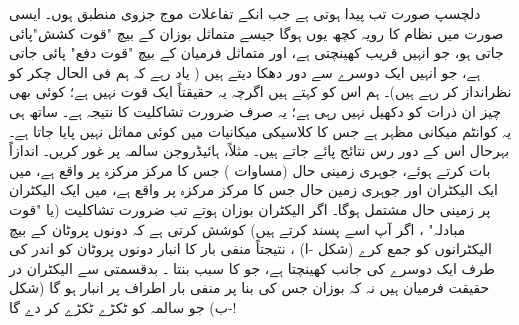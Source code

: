 دلچسپ صورت تب پیدا ہوتی ہے جب انکے  تفاعلات موج   جزوی منطبق ہوں۔ ایسی صورت میں نظام کا رویہ کچھ یوں ہوگا جیسے متماثل بوزان کے بیچ  "قوت کشش"پائی جاتی ہو،  جو انہیں قریب کھینچتی ہے،  اور  متماثل فرمیان کے بیچ "قوت دفع" پائی  جاتی ہے،  جو انہیں ایک دوسرے سے دور دھکا  دیتے ہیں ( یاد رہے کہ ہم فی الحال چکر کو نظرانداز کر رہے ہیں)۔ ہم اس کو   کہتے ہیں اگرچہ یہ حقیقتاً ایک قوت نہیں ہے؛ کوئی بھی چیز ان ذرات کو دکھیل نہیں رہی ہے؛  یہ صرف ضرورت تشاکلیت کا   نتیجہ ہے۔  ساتھ ہی یہ کوانٹم میکانی مظہر ہے جس کا کلاسیکی میکانیات میں کوئی مماثل نہیں پایا جاتا ہے۔ بہرحال اس کے دور رس  نتائج پائے جاتے ہیں۔ مثلاً،  ہائیڈروجن سالمہ  پر غور کریں۔ اندازاً بات کرتے ہوئے،  جوہری زمینی حال   (مساوات )   جس کا مرکز مرکزہ  پر واقع ہے، میں ایک الیکٹران اور  جوہری زمین حال جس کا مرکز مرکزہ  پر واقع ہے،   میں ایک الیکٹران  پر زمینی حال مشتمل ہوگا۔ اگر الیکٹران بوزان ہوتے تب ضرورت تشاکلیت  (یا  "قوت مبادلہ" ، اگر آپ اسے پسند کرتے ہیں) کوشش کرتی ہے کہ دونوں پروٹان کے بیچ الیکٹرانوں کو جمع کرے
 (شکل -ا)  ، نتیجتاً منفی بار کا انبار دونوں پروٹان کو اندر کی طرف ایک دوسرے کی جانب کھینچتا ہے،  جو  کا سبب بنتا ۔  بدقسمتی سے  الیکٹران  در حقیقت  فرمیان ہیں نہ کہ بوزان جس کی بنا    پر منفی بار   اطراف پر انبار  ہو گا   (شکل -ب)   جو سالمہ کو  ٹکڑے ٹکڑے کر دے  گا!

